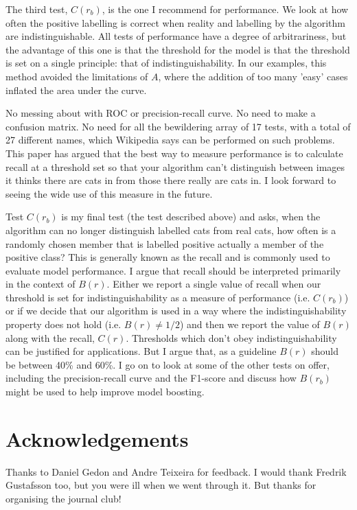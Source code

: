 \documentclass{article}
\begin{document}
The third test, $C(r_b)$, is the one I recommend for performance. We look at how often the positive labelling is correct when reality and labelling by the algorithm are indistinguishable. All tests of performance have a degree of arbitrariness, but the advantage of this one is that the threshold for the model is that the threshold is set on a single principle: that of indistinguishability. In our examples, this method avoided the limitations of $A$, where the addition of too many 'easy' cases inflated the area under the curve. 

No messing about with ROC or precision-recall curve. No need to make a confusion matrix. No need for all the bewildering array of 17 tests, with a total of 27 different names, which Wikipedia says can be performed on such problems. This paper has argued that the best way to measure performance is to calculate recall at a threshold set so that your algorithm can't distinguish between images it thinks there are cats in from those there really are cats in.  I look forward to seeing the wide use of this measure in the future. 

Test $C(r_b)$ is my final test (the test described above) and asks, when the algorithm can no longer distinguish labelled cats from real cats, how often is a randomly chosen member that is labelled positive actually a member of the positive class? This is generally known as the recall and is commonly used to evaluate model performance. I argue that recall should be interpreted primarily in the context of $B(r)$. Either we report a single value of recall when our threshold is set for indistinguishability as a measure of performance (i.e. $C(r_b)$) or if we decide that our algorithm is used in a way where the indistinguishability property does not hold (i.e. $B(r) \neq 1/2$) and then we report the value of $B(r)$ along with the recall, $C(r)$. Thresholds which don't obey indistinguishability can be justified for applications. But I argue that, as a guideline $B(r)$ should be between 40\% and 60\%.  I go on to look at some of the other tests on offer, including the precision-recall curve and the F1-score and discuss how $B(r_b)$ might be used to help improve model boosting. 

\section{Acknowledgements}

Thanks to Daniel Gedon and Andre Teixeira for feedback. I would thank Fredrik Gustafsson too, but you were ill when we went through it. But thanks for organising the journal club!
\end{document}
